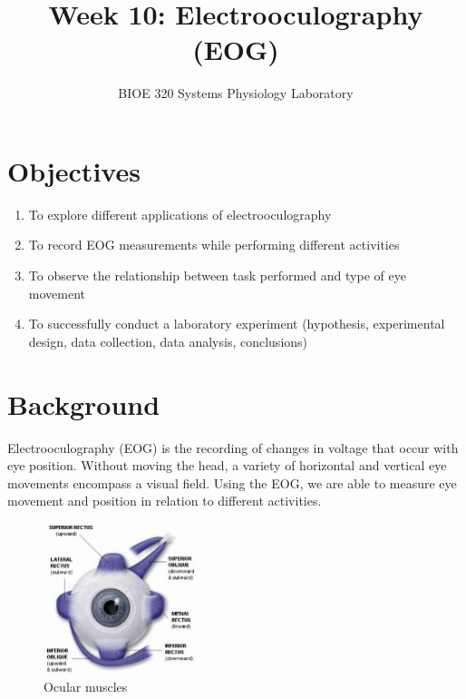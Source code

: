 \documentclass{article}
\title{Week 10: Electrooculography (EOG)}
\author{BIOE 320 Systems Physiology Laboratory}
\date{}
\begin{document}
\large
\maketitle

\section*{Objectives}
\begin{enumerate}
	\item To explore different applications of electrooculography
	\item To record EOG measurements while performing different activities
	\item To observe the relationship between task performed and type of eye movement
	\item To successfully conduct a laboratory experiment (hypothesis, experimental design, data collection, data analysis, conclusions)
\end{enumerate}

\section*{Background}
Electrooculography (EOG) is the recording of changes in voltage that occur with eye position. Without moving the head, a variety of horizontal and vertical eye movements encompass a visual field. Using the EOG, we are able to measure eye movement and position in relation to different activities.

\begin{figure}[h]
\centering\includegraphics[width=0.4\textwidth]{../images/EOG_1.jpg}
\caption{Ocular muscles}
\label{eye}
\end{figure}
\end{document}
